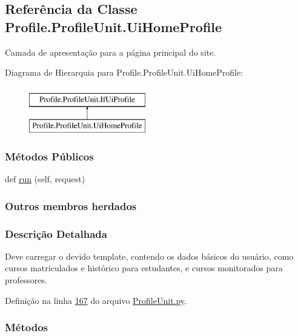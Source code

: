 \hypertarget{classProfile_1_1ProfileUnit_1_1UiHomeProfile}{}\subsection{Referência da Classe Profile.\+Profile\+Unit.\+Ui\+Home\+Profile}
\label{classProfile_1_1ProfileUnit_1_1UiHomeProfile}


Camada de apresentação para a página principal do site.  


Diagrama de Hierarquia para Profile.\+Profile\+Unit.\+Ui\+Home\+Profile\+:\begin{figure}[H]
\begin{center}
\leavevmode
\includegraphics[height=2.000000cm]{db/dcf/classProfile_1_1ProfileUnit_1_1UiHomeProfile}
\end{center}
\end{figure}
\subsubsection*{Métodos Públicos}
\begin{DoxyCompactItemize}
\item 
def \hyperlink{classProfile_1_1ProfileUnit_1_1UiHomeProfile_ac3f4ee661e0cb6fbc3c58285ce5f57d6}{run} (self, request)
\end{DoxyCompactItemize}
\subsubsection*{Outros membros herdados}


\subsubsection{Descrição Detalhada}
Deve carregar o devido template, contendo os dados básicos do usuário, como cursos matriculados e histórico para estudantes, e cursos monitorados para professores. 

Definição na linha \hyperlink{ProfileUnit_8py_source_l00167}{167} do arquivo \hyperlink{ProfileUnit_8py_source}{Profile\+Unit.\+py}.



\subsubsection{Métodos}
\hypertarget{classProfile_1_1ProfileUnit_1_1UiHomeProfile_ac3f4ee661e0cb6fbc3c58285ce5f57d6}{}
